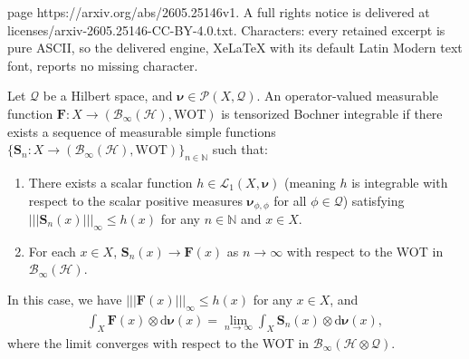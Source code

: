 \documentclass[10pt,a4paper]{amsart}
\newcommand{\mb}[1]{\boldsymbol{#1}} %
\newcommand{\m}[1]{\mathbf{#1}} %
\newcommand{\rd}{\mathrm{d}} %
\newcommand{\s}[1]{\mathscr{#1}} %
\newcommand{\vertiii}[1]{\mathopen{|||} #1 \mathclose{|||}}
\renewcommand{\b}[1]{\mathbb{#1}} %
\renewcommand{\c}[1]{\mathcal{#1}} %
\begin{document}
page https://arxiv.org/abs/2605.25146v1. A full rights notice is delivered at licenses/arxiv-2605.25146-CC-BY-4.0.txt. Characters: every retained excerpt is pure ASCII, so the delivered engine, XeLaTeX with its default Latin Modern text font, reports no missing character.
\begin{theorem}\label{thm:tens:lebesgue}
Let $\c{Q}$ be a Hilbert space, and $\mb{\nu} \in \s{P}(X, \c{Q})$. An operator-valued measurable function $\m{F}: X \to (\c{B}_{\infty}(\c{H}), \mathrm{WOT})$ is tensorized Bochner integrable if there exists a sequence of measurable simple functions $\{\m{S}_{n}: X \to (\c{B}_{\infty}(\c{H}), \mathrm{WOT}) \}_{n \in \b{N}}$ such that:
\begin{enumerate}
    \item There exists a scalar function $h \in \c{L}_{1}(X, \mb{\nu})$ (meaning $h$ is integrable with respect to the scalar positive measures $\mb{\nu}_{\phi, \phi}$ for all $\phi \in \c{Q}$) satisfying $\vertiii{\m{S}_{n}(x)}_{\infty} \le h(x)$ for any $n \in \b{N}$ and $x \in X$.
    \item For each $x \in X$, $\m{S}_{n}(x) \to \m{F}(x)$ as $n \to \infty$ with respect to the WOT in $\c{B}_{\infty}(\c{H})$.
\end{enumerate}
In this case, we have $\vertiii{\m{F}(x)}_{\infty} \le h(x)$ for any $x \in X$, and
\begin{align*}
    \int_{X} \m{F}(x) \otimes \rd \mb{\nu}(x) = \lim_{n \to \infty} \int_{X} \m{S}_{n}(x) \otimes \rd \mb{\nu}(x),
\end{align*}
where the limit converges with respect to the WOT in $\c{B}_{\infty}(\c{H} \otimes \c{Q})$.
\end{theorem}
\end{document}
